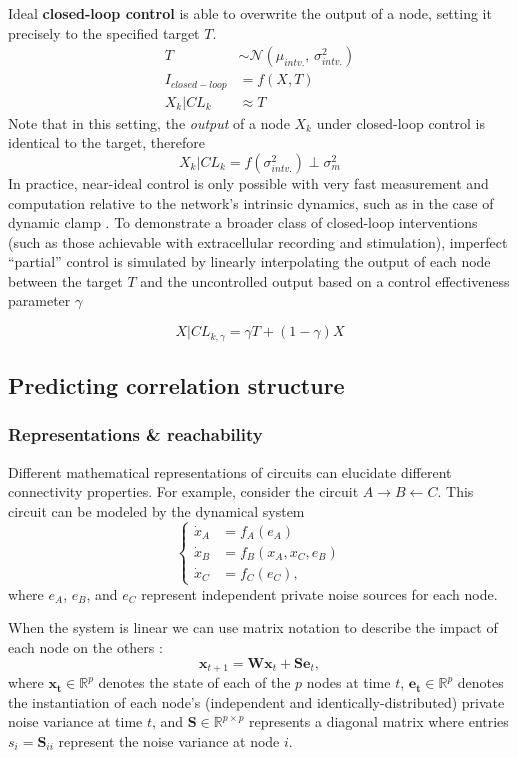 \documentclass{article}
\begin{document}
Ideal \textbf{closed-loop control} is able to overwrite the output of a node, setting it precisely to the specified target \(T\). \[
\begin{aligned}
T &\sim \mathcal{N}(\mu_{intv.},\,\sigma^{2}_{intv.}) \\
I_{closed-loop} &= f(X, T)  \\
X_k | CL_{k} &\approx T
\end{aligned}
\] Note that in this setting, the \emph{output} of a node \(X_k\) under closed-loop control is identical to the target, therefore \[
X_k | CL_{k} = f(\sigma^{2}_{intv.}) \perp \sigma^2_m
\] In practice, near-ideal control is only possible with very fast measurement and computation relative to the network's intrinsic dynamics, such as in the case of dynamic clamp
\autocite{sharp1993dynamic,prinz2004dynamic}. To demonstrate a broader class of closed-loop interventions (such as those achievable with extracellular recording and stimulation), imperfect ``partial'' control is simulated by linearly interpolating the output of each node between the target \(T\) and the uncontrolled output based on a control effectiveness parameter \(\gamma\)

\[
X | CL_{k, \gamma} = \gamma T + (1-\gamma) X
\]

\hypertarget{sec:methods-predict-overview}{%
\subsection{Predicting correlation structure}\label{sec:methods-predict-overview}}

\hypertarget{sec:methods-reach}{%
\subsubsection{Representations \&
reachability}\label{sec:methods-reach}}

Different mathematical representations of circuits can elucidate different connectivity properties. For example, consider the circuit
\(A \rightarrow B \leftarrow C\). This circuit can be modeled by the dynamical system \[
\begin{cases}
\dot{x}_A &= f_A(e_A) \\
\dot{x}_B &= f_B(x_A, x_C, e_B) \\
\dot{x}_C &= f_C(e_C),
\end{cases}
\] where \(e_A\), \(e_B\), and \(e_C\) represent independent private noise sources for each node.

When the system is linear we can use matrix notation to describe the impact of each node on the others \autocite{fornito2016connectivity}: \[
\mathbf{x}_{t+1} = \mathbf{W x}_t + \mathbf{Se}_t,
\] where \(\mathbf{x_t} \in \mathbb{R}^p\) denotes the state of each of the \(p\) nodes at time \(t\), \(\mathbf{e_t} \in \mathbb{R}^p\) denotes the instantiation of each node's (independent and identically-distributed) private noise variance at time \(t\), and
\(\mathbf{S} \in \mathbb{R}^{p \times p}\) represents a diagonal matrix where entries \(s_{i} = \mathbf{S}_{ii}\) represent the noise variance at node \(i\).
\end{document}
